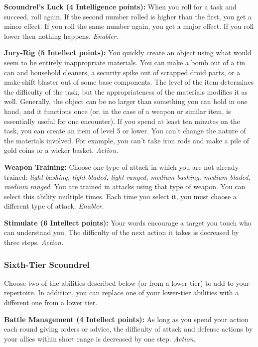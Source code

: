 \documentclass[a4paper,10pt,final,twocolumn,oneside]{book}
\newcommand{\itemAbility}[2]{\textcolor{25gray}{\textbullet\textbf{ #1:}}{ #2}\par}
\newcommand{\enabler}{\textit{ Enabler.}}
\newcommand{\action}{\textit{ Action.}}
\begin{document}
\itemAbility{Scoundrel's Luck (4 Intelligence points)}{When you roll for a task and succeed, roll again. If the second number rolled is higher than the first, you get a minor effect. If you roll the same number again, you get a major effect. If you roll lower then nothing happens. \enabler}

\itemAbility{Jury-Rig (5 Intellect points)}{You quickly create an object using what would seem to be entirely inappropriate materials. You can make a bomb out of a tin can and household cleaners, a security spike out of scrapped droid parts, or a make-shift blaster out of some base components. The level of the item determines the difficulty of the task, but the appropriateness of the materials modifies it as well. Generally, the object can be no larger than something you can hold in one hand, and it functions once (or, in the case of a weapon or similar item, is essentially useful for one encounter). If you spend at least ten minutes on the task, you can create an item of level 5 or lower. You can’t change the nature of the materials involved. For example, you can’t take iron rods and make a pile of gold coins or a wicker basket.\action}

\itemAbility{Weapon Training}{Choose one type of attack in which you are not already trained: \textit{light bashing, light bladed, light ranged, medium bashing, medium bladed, medium ranged}. You are trained in attacks using that type of weapon. You can select this ability multiple times. Each time you select it, you must choose a different type of attack.\enabler}

\itemAbility{Stimulate (6 Intellect points)}{Your words encourage a target you touch who can understand you. The difficulty of the next action it takes is decreased by three steps.\action}


\subsubsection*{Sixth-Tier Scoundrel}
\label{subsub:scoundrelSixthTier}

Choose two of the abilities described below (or from a lower tier) to add to your repertoire. In addition, you can replace one of your lower-tier abilities with a different one from a lower tier.

\itemAbility{Battle Management (4 Intellect points)}{As long as you spend your action each round giving orders or advice, the difficulty of attack and defense actions by your allies within short range is decreased by one step.\action}
\end{document}
